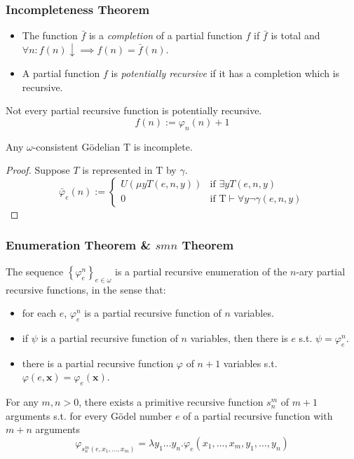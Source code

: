 \documentclass[UTF8,aspectratio=43,11pt,colorlinks,compress,openany]{beamer}%
\begin{document}
\begin{frame}\frametitle{Incompleteness Theorem}
\setlength\abovedisplayskip{0pt}
\setlength\belowdisplayskip{0pt}
	\begin{itemize}
		\item The function $\bar{f}$ is a \emph{completion} of a partial function $f$ if $\bar{f}$ is total and $\forall n: f(n)\downarrow\implies f(n)=\bar{f}(n)$.
		\item A partial function $f$ is \emph{potentially recursive} if it has a completion which is recursive.
	\end{itemize}
	\begin{block}{Not every partial recursive function is potentially recursive.}
		\[f(n):=\varphi_n(n)+1\]
	\end{block}
	\begin{theorem}
		Any $\omega$-consistent G\"odelian $\mathrm{T}$ is incomplete.
	\end{theorem}
	\begin{proof}
		Suppose $T$ is represented in $\mathrm{T}$ by $\gamma$.
		\[
		\bar{\varphi}_e(n):=
		\begin{cases}
		U(\mu y T(e,n,y)) &\text{if } \exists y T(e,n,y)\\
		0 &\text{if } \mathrm{T}\vdash\forall y\neg\gamma(e,n,y)
		\end{cases}
		\]
	\end{proof}
\end{frame}

\begin{frame}\frametitle{Enumeration Theorem \& $smn$ Theorem}
	\begin{theorem}
		The sequence $\left\{\varphi_e^n\right\}_{e\in\omega}$ is a partial recursive enumeration of the $n$-ary partial recursive functions, in the sense that: 
		\begin{itemize}
			\item for each $e$, $\varphi_e^n$ is a partial recursive function of $n$ variables.
			\item if $\psi$ is a partial recursive function of $n$ variables, then there is $e$ s.t. $\psi=\varphi_e^n$.
			\item there is a partial recursive function $\varphi$ of $n+1$ variables s.t. $\varphi(e,\mathbf{x})=\varphi_e(\mathbf{x})$.
		\end{itemize}
	\end{theorem}
	\begin{theorem}
		For any $m, n > 0$, there exists a primitive recursive function $s_n^m$ of $m + 1$ arguments s.t. for every G\"odel number $e$ of a partial recursive function with $m + n$ arguments
	\setlength\abovedisplayskip{0pt}
	\setlength\belowdisplayskip{0pt}
		\[\varphi_{s_n^m (e,x_1,\dots,x_m)}=\lambda y_1\dots y_n.\varphi_e(x_1,\dots,x_m,y_1,\dots,y_n)\]
	\end{theorem}
\end{frame}
\end{document}
